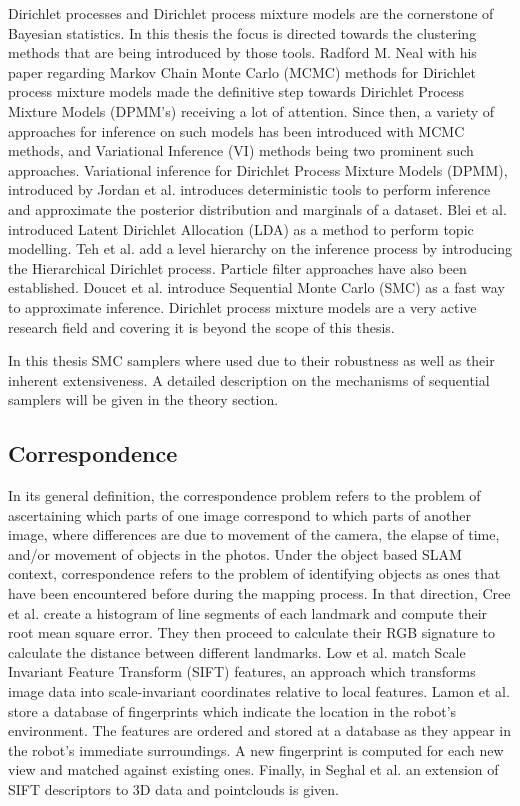 \documentclass [twoside,hidelinks]{article}
\begin{document}
Dirichlet processes and Dirichlet process mixture models are the cornerstone of Bayesian statistics. In this thesis the focus is directed towards the clustering methods that are being introduced by those tools. Radford M. Neal\cite{bayes:neal} with his paper regarding Markov Chain Monte Carlo (MCMC) methods for Dirichlet process mixture models made the definitive step towards Dirichlet Process Mixture Models (DPMM's) receiving a lot of attention. Since then, a variety of approaches for inference on such models has been introduced with MCMC methods, and Variational Inference (VI) methods being two prominent such approaches. Variational inference for Dirichlet Process Mixture Models (DPMM), introduced by Jordan et al.\cite{bayes:jordan} introduces deterministic tools to perform inference and approximate the posterior distribution and marginals of a dataset. Blei et al.\cite{LDA} introduced Latent Dirichlet Allocation (LDA) as a method to perform topic modelling. Teh et al.\cite{bayes:hier} add a level hierarchy on the inference process by introducing the Hierarchical Dirichlet process. Particle filter approaches have also been established. Doucet et al.\cite{bayes:smc} introduce Sequential Monte Carlo (SMC) as a fast way to approximate inference. Dirichlet process mixture models are a very active research field and covering it is beyond the scope of this thesis. 

In this thesis SMC samplers where used due to their robustness as well as their inherent extensiveness. A detailed description on the mechanisms of sequential samplers will be given in the theory section.

\subsection{Correspondence}

In its general definition, the correspondence problem refers to the problem of ascertaining which parts of one image correspond to which parts of another image, where differences are due to movement of the camera, the elapse of time, and/or movement of objects in the photos. Under the object based SLAM context, correspondence refers to the problem of identifying objects as ones that have been encountered before during the mapping process. In that direction, Cree et al.\cite{corresp:first} create a histogram of line segments of each landmark and compute their root mean square error. They then proceed to calculate their RGB signature to calculate the distance between different landmarks. Low et al.\cite{corres:sec} match Scale Invariant Feature Transform  (SIFT) features, an approach which transforms image data into scale-invariant coordinates relative to local features. Lamon et al.\cite{corres:three} store a database of fingerprints which indicate the location in the robot's environment. The features are ordered and stored at a database as they appear in the robot's immediate surroundings. A new fingerprint is computed for each new view and matched against existing ones. Finally, in Seghal et al.\cite{corres:four} an extension of SIFT descriptors to 3D data and pointclouds is given. 
\end{document}
